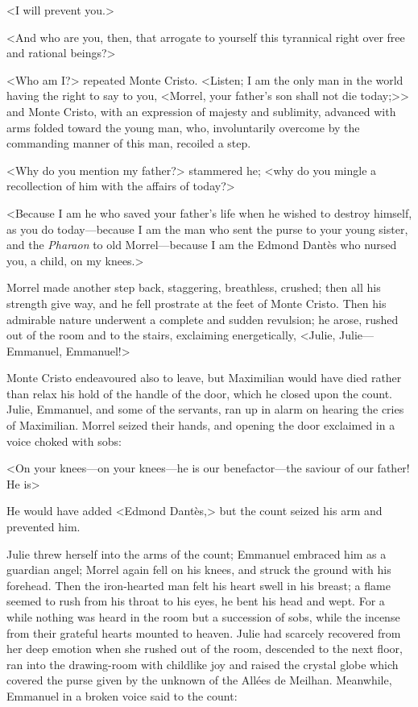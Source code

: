  <I will prevent you.>

<And who are you, then, that arrogate to yourself this tyrannical right over free and rational beings?> 

 <Who am I?> repeated Monte Cristo. <Listen; I am the only man in the world having the right to say to you, <Morrel, your father's son shall not die today;>> and Monte Cristo, with an expression of majesty and sublimity, advanced with arms folded toward the young man, who, involuntarily overcome by the commanding manner of this man, recoiled a step. 

 <Why do you mention my father?> stammered he; <why do you mingle a recollection of him with the affairs of today?> 

 <Because I am he who saved your father's life when he wished to destroy himself, as you do today—because I am the man who sent the purse to your young sister, and the \textit{Pharaon} to old Morrel—because I am the Edmond Dantès who nursed you, a child, on my knees.> 

 Morrel made another step back, staggering, breathless, crushed; then all his strength give way, and he fell prostrate at the feet of Monte Cristo. Then his admirable nature underwent a complete and sudden revulsion; he arose, rushed out of the room and to the stairs, exclaiming energetically, <Julie, Julie—Emmanuel, Emmanuel!> 

 Monte Cristo endeavoured also to leave, but Maximilian would have died rather than relax his hold of the handle of the door, which he closed upon the count. Julie, Emmanuel, and some of the servants, ran up in alarm on hearing the cries of Maximilian. Morrel seized their hands, and opening the door exclaimed in a voice choked with sobs: 

 <On your knees—on your knees—he is our benefactor—the saviour of our father! He is\longdash> 

 He would have added <Edmond Dantès,> but the count seized his arm and prevented him. 

 Julie threw herself into the arms of the count; Emmanuel embraced him as a guardian angel; Morrel again fell on his knees, and struck the ground with his forehead. Then the iron-hearted man felt his heart swell in his breast; a flame seemed to rush from his throat to his eyes, he bent his head and wept. For a while nothing was heard in the room but a succession of sobs, while the incense from their grateful hearts mounted to heaven. Julie had scarcely recovered from her deep emotion when she rushed out of the room, descended to the next floor, ran into the drawing-room with childlike joy and raised the crystal globe which covered the purse given by the unknown of the Allées de Meilhan. Meanwhile, Emmanuel in a broken voice said to the count: 

